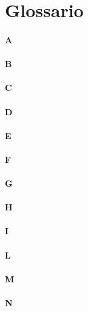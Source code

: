 \appendix
\section{Glossario}
\paragraph*{A}

\paragraph*{B}

\paragraph*{C}

\paragraph*{D}

\paragraph*{E}

\paragraph*{F}

\paragraph*{G}

\paragraph*{H}

\paragraph*{I}

\paragraph*{L}

\paragraph*{M}

\paragraph*{N}

